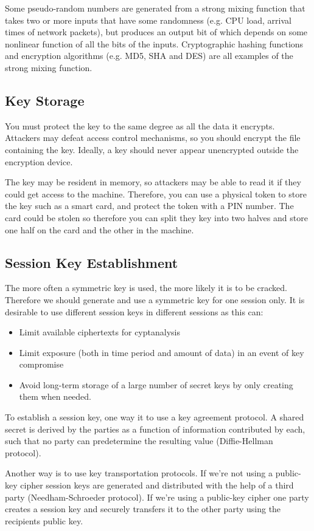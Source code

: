\documentclass{article}
\begin{document}
Some pseudo-random numbers are generated from a strong mixing function that takes two or more inputs that have some randomness (e.g. CPU load, arrival times of network packets), but produces an output bit of which depends on some nonlinear function of all the bits of the inputs. Cryptographic hashing functions and encryption algorithms (e.g. MD5, SHA and DES) are all examples of the strong mixing function.

\subsection{Key Storage}
You must protect the key to the same degree as all the data it encrypts. Attackers may defeat access control mechanisms, so you should encrypt the file containing the key. Ideally, a key should never appear unencrypted outside the encryption device.

The key may be resident in memory, so attackers may be able to read it if they could get access to the machine. Therefore, you can use a physical token to store the key such as a smart card, and protect the token with a PIN number. The card could be stolen so therefore you can split they key into two halves and store one half on the card and the other in the machine.

\subsection{Session Key Establishment}
The more often a symmetric key is used, the more likely it is to be cracked. Therefore we should generate and use a symmetric key for one session only. It is desirable to use different session keys in different sessions as this can:
\begin{itemize}
  \item Limit available ciphertexts for cyptanalysis
  \item Limit exposure (both in time period and amount of data) in an event of key compromise
  \item Avoid long-term storage of a large number of secret keys by only creating them when needed.
\end{itemize}
To establish a session key, one way it to use a key agreement protocol. A shared secret is derived by the parties as a function of information contributed by each, such that no party can predetermine the resulting value (Diffie-Hellman protocol).

Another way is to use key transportation protocols. If we're not using a public-key cipher session keys are generated and distributed with the help of a third party (Needham-Schroeder protocol). If we're using a public-key cipher one party creates a session key and securely transfers it to the other party using the recipients public key.
\end{document}
